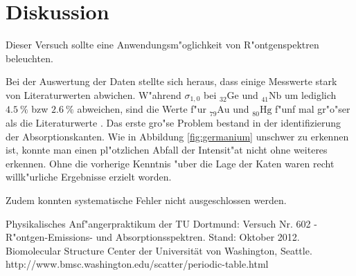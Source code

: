 \newpage
\section{Diskussion}
	\label{sec:diskussion}
	Dieser Versuch sollte eine Anwendungsm"oglichkeit von R"ontgenspektren beleuchten.

	Bei der Auswertung der Daten stellte sich heraus, dass einige Messwerte stark von Literaturwerten abwichen. W"ahrend $\sigma_{1,0}$ bei ${}_{32}^{}\mathrm{Ge}$ und ${}_{41}^{}\mathrm{Nb}$ um lediglich $\SI{4.5}{\percent}$ bzw $\SI{2.6}{\percent}$ abweichen, sind die Werte f"ur ${}_{79}^{}\mathrm{Au}$ und ${}_{80}^{}\mathrm{Hg}$ f"unf mal gr"o"ser als die Literaturwerte \cite{literatur}.
	Das erste gro"se Problem bestand in der identifizierung der Absorptionskanten.
	Wie in Abbildung \ref{fig:germanium} unschwer zu erkennen ist, konnte man einen pl"otzlichen Abfall der Intensit"at nicht ohne weiteres erkennen.
	Ohne die vorherige Kenntnis "uber die Lage der Katen waren recht willk"urliche Ergebnisse erzielt worden.

	Zudem konnten systematische Fehler nicht ausgeschlossen werden.
	
\begin{thebibliography}{9}
	 Physikalisches Anf"angerpraktikum der TU Dortmund: Versuch Nr. 602 - R"ontgen-Emissions- und Absorptionsspektren. Stand: Oktober 2012.
	 Biomolecular Structure Center der Universität von Washington, Seattle. http://www.bmsc.washington.edu/scatter/periodic-table.html
\end{thebibliography}